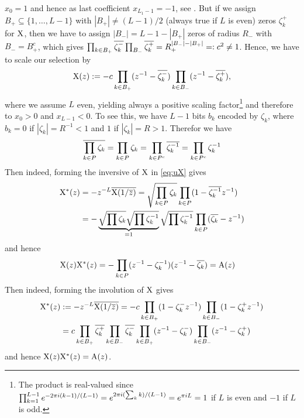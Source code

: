 \documentclass[conference]{IEEEtran}
\begin{document}
$x_0=1$ and hence as last coefficient $x_{L_1-1}=-1$, see . But if we assign
$B_+\subseteq\{1,\dots,L-1\}$  with $|B_+|\not=(L-1)/2$ (always true if $L$ is even) zeros $\zeta_k^+$ for ${\mathrm X}$, then
we have to assign $|B_-|=L-1-|B_+|$ zeros of radius $R_-$ with $B_-=B_+^c$, which gives $\prod_{k\in B_+}
{\overline{{\zeta}_{k}^{-}}}\prod_{B_-}{\overline{\zeta_k^+}}=R_+^{|B_-|-|B_+|}=:c^2\not=1$. Hence, we have to scale our selection by
%
\begin{align}
  {\ensuremath{\mathrm X}}(z):= -c \prod_{k\in B_+} (z^{-1} - {\overline{\zeta_{k}^{-}}})\prod_{k\in B_-} (z^{-1} -
  {\overline{\zeta_{k}^{+}}}),\label{eq:uX}
\end{align}
%
where we assume $L$ even, yielding always a positive scaling factor\footnote{The product is real-valued since
$\prod_{k=1}^{L-1} e^{-2\pi i (k-1)/(L-1)}=e^{2\pi i (\sum_k k)/(L-1)}=e^{\pi i L} =1$ if $L$ is even and $-1$ if $L$ is
odd.}
%
and therefore to $x_0>0$ and $x_{L-1}<0$. 
%
To see this,  we have $L-1$ bits $b_k$ encoded by $\zeta_k$, where $b_k=0$  if
$|\zeta_k|=R^{-1}<1$ and $1$ if $|\zeta_k|=R>1$.  Therefor we have
%
\begin{align}
 {\ensuremath{\overline{\prod_{k\in P}\zeta_k}}}= \prod_{k\in P}\zeta_k= \prod_{k\in P^c} {\overline{\zeta_k^{-1}}}=\prod_{k\in P^c}\zeta_k^{-1}
\end{align}
%
Then indeed, forming the inversive of ${\mathrm X}$ in \eqref{eq:uX} gives
%
\begin{align}
  {\ensuremath{\mathrm X}}^*(z)&= -z^{-L} {\overline{{\mathrm X}(1/{\overline{z}})}}= \sqrt{\prod_{k\in P} \zeta_k} \prod_{k\in P} (1-{\overline{\zeta_k^{-1}}} z^{-1})\\
  &=-\underbrace{\sqrt{\prod \zeta_k} \sqrt{\prod \zeta_k^{-1}}}_{=1} \sqrt{\prod \zeta_k^{-1}} \prod_{k\in P}({\overline{\zeta_k}} - z^{-1})
\end{align}
%
and hence
%
\begin{align*}
  \uX(z)\uX^*(z) %
  &= -\Pro_{k\in P} (z^{-1} -\zeta_k^{-1})(z^{-1}  -\cc{\zeta_k})=\uA(z)
\end{align*}
%
\fi
Then indeed, forming the involution of ${\mathrm X}$  gives
%
\begin{align}
  {\ensuremath{\mathrm X}}^*(z)&:= -z^{-L} {\overline{{\mathrm X}(1/{\overline{z}})}}
  = -c\prod_{k\in B_+} (1-\zeta_k^{-} z^{-1}) \prod_{k\in B_-} (1-\zeta_k^{+} z^{-1})\notag\\
  &= c \prod_{k\in B_+} {\overline{\zeta_k^+}}\prod_{k\in B_-}{\overline{\zeta_k^-}} \prod_{k\in B_+} (z^{-1}-\zeta_k^{-}) \prod_{k\in
  B_-} (z^{-1}-\zeta_k^{+}) \notag 
\end{align}
%
and hence ${\mathrm X}(z){\mathrm X}^*(z) = {\mathrm A}(z)$.
%
\end{document}
